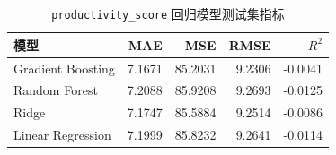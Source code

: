 \begin{table}[H]
\centering
\caption{\texttt{productivity\_score} 回归模型测试集指标}
\label{tab:regression-productivity}
\begin{tabular}{lrrrr}
\toprule
模型 & MAE & MSE & RMSE & $R^2$ \\
\midrule
Gradient Boosting & 7.1671 & 85.2031 & 9.2306 & -0.0041 \\
Random Forest & 7.2088 & 85.9208 & 9.2693 & -0.0125 \\
Ridge & 7.1747 & 85.5884 & 9.2514 & -0.0086 \\
Linear Regression & 7.1999 & 85.8232 & 9.2641 & -0.0114 \\
\bottomrule
\end{tabular}
\end{table}
